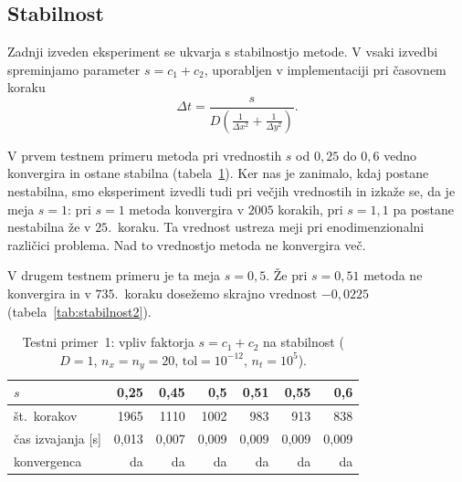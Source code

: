 \documentclass[a4paper,11pt]{article}
\begin{document}
	\subsection{Stabilnost}
	
	Zadnji izveden eksperiment se ukvarja s stabilnostjo metode. V vsaki izvedbi spreminjamo parameter $s = c_1 + c_2$, uporabljen v implementaciji pri časovnem koraku
	\begin{equation}
		\Delta t = \frac{s}{D\left(\frac{1}{\Delta x^2} + \frac{1}{\Delta y^2}\right)}.
	\end{equation}
	
	V prvem testnem primeru metoda pri vrednostih $s$ od $0{,}25$ do $0{,}6$ vedno konvergira in ostane stabilna (tabela~\ref{tab:stabilnost1}). Ker nas je zanimalo, kdaj postane nestabilna, smo eksperiment izvedli tudi pri večjih vrednostih in izkaže se, da je meja $s = 1$: pri $s = 1$ metoda konvergira v $2005$ korakih, pri $s = 1{,}1$ pa postane nestabilna že v $25.$~koraku. Ta vrednost ustreza meji pri enodimenzionalni različici problema. Nad to vrednostjo metoda ne konvergira več.
	
	V drugem testnem primeru je ta meja $s = 0{,}5$. Že pri $s = 0{,}51$ metoda ne konvergira in v $735.$~koraku dosežemo skrajno vrednost $-0{,}0225$ (tabela~\ref{tab:stabilnost2}).
	
	\begin{table}[htbp]
		\centering
		\begin{tabular}{lrrrrrr}
			\toprule
			$s$                  & 0{,}25  & 0{,}45  & 0{,}5   & 0{,}51  & 0{,}55  & 0{,}6   \\
			\midrule
			št.\ korakov         & 1965    & 1110    & 1002    & 983     & 913     & 838     \\
			čas izvajanja [s]    & 0{,}013 & 0{,}007 & 0{,}009 & 0{,}009 & 0{,}009 & 0{,}009 \\
			konvergenca          & da      & da      & da      & da      & da      & da      \\
			\bottomrule
		\end{tabular}
		\caption{Testni primer~1: vpliv faktorja $s = c_1 + c_2$ na stabilnost ($D = 1$, $n_x = n_y = 20$, $\text{tol} = 10^{-12}$, $n_t = 10^5$).}
		\label{tab:stabilnost1}
	\end{table}
	
\end{document}
